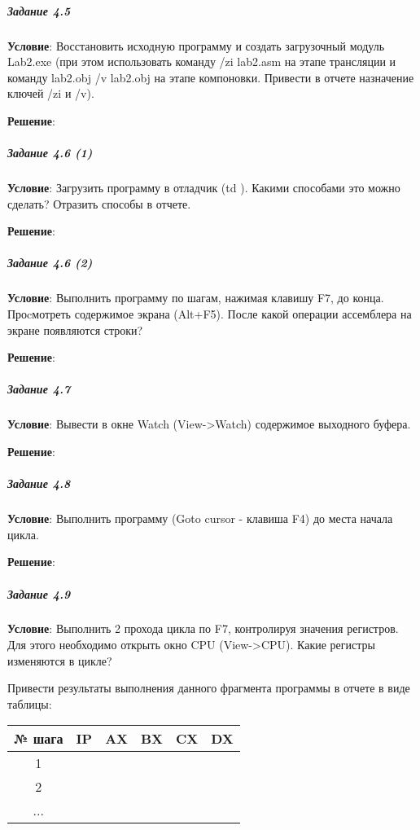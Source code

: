 \subparagraph{Задание 4.5}

\textbf{Условие}:
Восстановить исходную программу и создать загрузочный модуль Lab2.exe (при этом использовать команду  /zi lab2.asm на этапе трансляции и команду lab2.obj  /v lab2.obj на этапе компоновки. Привести в отчете назначение ключей /zi и /v).

\textbf{Решение}:



\subparagraph{Задание 4.6 (1)}

\textbf{Условие}:
Загрузить программу в отладчик (td ). Какими способами это можно сделать? Отразить способы в отчете.

\textbf{Решение}:



\subparagraph{Задание 4.6 (2)}

\textbf{Условие}:
Выполнить программу по шагам, нажимая клавишу F7, до конца. Проcмотреть содержимое экрана (Alt+F5). После какой операции ассемблера на экране появляются строки?
 
\textbf{Решение}:



\subparagraph{Задание 4.7}

\textbf{Условие}:
Вывести в окне Watch (View->Watch) содержимое выходного буфера. 

\textbf{Решение}:



\subparagraph{Задание 4.8}

\textbf{Условие}:
Выполнить программу (Goto cursor - клавиша F4) до места начала цикла. 

\textbf{Решение}:



\subparagraph{Задание 4.9}

\textbf{Условие}:
Выполнить 2 прохода цикла по F7, контролируя значения регистров. Для этого необходимо открыть окно CPU (View->CPU). Какие регистры изменяются в цикле?

Привести результаты выполнения данного фрагмента программы в отчете в виде таблицы:

\begin{table}[!ht]
   \centering

   \begin{tabular}{|c|c|c|c|c|c|} 
      \hline
      № шага  & IP  & AX  & BX  & CX  & DX  \\ \hline
      \hline
      1       &     &     &     &     &     \\ \hline
      2       &     &     &     &     &     \\ \hline
      ...     &     &     &     &     &     \\ \hline
   \end{tabular}
\end{table}

